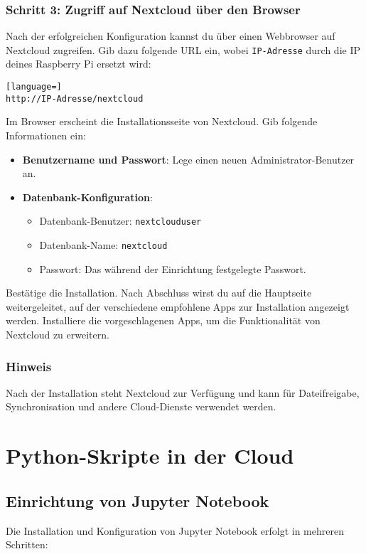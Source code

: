 \documentclass[a4paper,12pt]{article}
\begin{document}
\subsubsection{Schritt 3: Zugriff auf Nextcloud über den Browser}
Nach der erfolgreichen Konfiguration kannst du über einen Webbrowser auf Nextcloud zugreifen. Gib dazu folgende URL ein, wobei \texttt{IP-Adresse} durch die IP deines Raspberry Pi ersetzt wird:
\begin{lstlisting}[language=]
http://IP-Adresse/nextcloud
\end{lstlisting}

Im Browser erscheint die Installationsseite von Nextcloud. Gib folgende Informationen ein:
\begin{itemize}
    \item \textbf{Benutzername und Passwort}: Lege einen neuen Administrator-Benutzer an.
    \item \textbf{Datenbank-Konfiguration}:
    \begin{itemize}
        \item Datenbank-Benutzer: \texttt{nextclouduser}
        \item Datenbank-Name: \texttt{nextcloud}
        \item Passwort: Das während der Einrichtung festgelegte Passwort.
    \end{itemize}
\end{itemize}

Bestätige die Installation. Nach Abschluss wirst du auf die Hauptseite weitergeleitet, auf der verschiedene empfohlene Apps zur Installation angezeigt werden. Installiere die vorgeschlagenen Apps, um die Funktionalität von Nextcloud zu erweitern.

\subsubsection{Hinweis}
Nach der Installation steht Nextcloud zur Verfügung und kann für Dateifreigabe, Synchronisation und andere Cloud-Dienste verwendet werden.

\section{Python-Skripte in der Cloud}
\subsection{Einrichtung von Jupyter Notebook}
Die Installation und Konfiguration von Jupyter Notebook erfolgt in mehreren Schritten:
\end{document}
